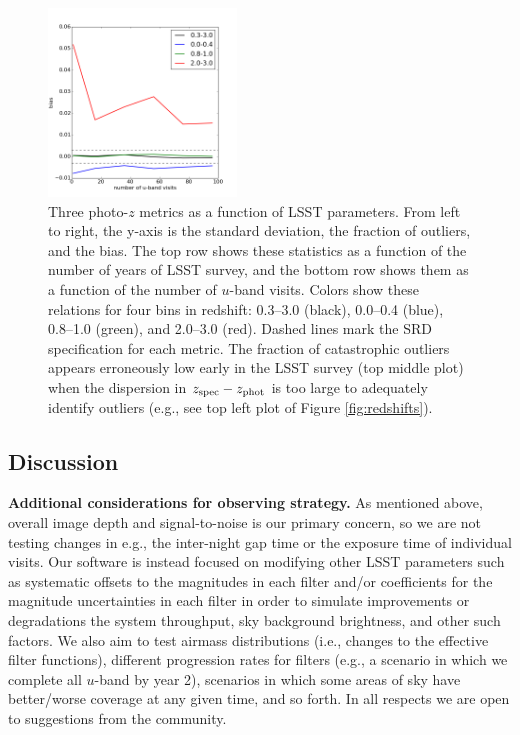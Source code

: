 \begin{figure}[h]
\begin{center}
\includegraphics[width=5cm]{figs/photoz/uvisits_bias.png}
\caption{Three photo-$z$ metrics as a function of LSST parameters. From
left to right, the y-axis is the standard deviation, the fraction of
outliers, and the bias. The top row shows these statistics as a function
of the number of years of LSST survey, and the bottom row shows them as
a function of the number of $u$-band visits. Colors show these relations
for four bins in redshift: 0.3--3.0 (black), 0.0--0.4 (blue), 0.8--1.0
(green), and 2.0--3.0 (red). Dashed lines mark the SRD specification for
each metric. The fraction of catastrophic outliers appears erroneously
low early in the LSST survey (top middle plot) when the dispersion in
$z_{\rm spec}-z_{\rm phot}$ is too large to adequately identify outliers
(e.g., see top left plot of Figure \ref{fig:redshifts}).
\label{fig:metrics}}
\end{center}
\end{figure}


\subsection{Discussion}

\textbf{Additional considerations for observing strategy.} As mentioned
above, overall image depth and signal-to-noise is our primary concern,
so we are not testing changes in e.g., the inter-night gap time or the
exposure time of individual visits.  Our software is instead focused on
modifying other LSST parameters such as systematic offsets to the
magnitudes in each filter and/or coefficients for the magnitude
uncertainties in each filter in order to simulate improvements or
degradations the system throughput, sky background brightness, and other
such factors. We also aim to test airmass distributions (i.e., changes
to the effective filter functions), different progression rates for
filters (e.g., a scenario in which we complete all $u$-band by year 2),
scenarios in which some areas of sky have better/worse coverage at any
given time, and so forth. In all respects we are open to suggestions
from the community.

